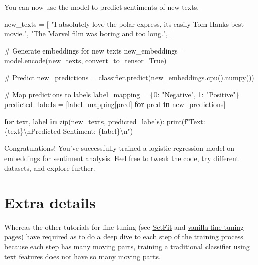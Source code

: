 \documentclass[
  letterpaper,
  DIV=11,
  numbers=noendperiod]{scrreprt}
\newenvironment{Shaded}{\begin{snugshade}}{\end{snugshade}}
\newcommand{\BuiltInTok}[1]{\textcolor[rgb]{0.00,0.23,0.31}{#1}}
\newcommand{\CharTok}[1]{\textcolor[rgb]{0.13,0.47,0.30}{#1}}
\newcommand{\CommentTok}[1]{\textcolor[rgb]{0.37,0.37,0.37}{#1}}
\newcommand{\ControlFlowTok}[1]{\textcolor[rgb]{0.00,0.23,0.31}{\textbf{#1}}}
\newcommand{\DecValTok}[1]{\textcolor[rgb]{0.68,0.00,0.00}{#1}}
\newcommand{\KeywordTok}[1]{\textcolor[rgb]{0.00,0.23,0.31}{\textbf{#1}}}
\newcommand{\NormalTok}[1]{\textcolor[rgb]{0.00,0.23,0.31}{#1}}
\newcommand{\OperatorTok}[1]{\textcolor[rgb]{0.37,0.37,0.37}{#1}}
\newcommand{\SpecialCharTok}[1]{\textcolor[rgb]{0.37,0.37,0.37}{#1}}
\newcommand{\SpecialStringTok}[1]{\textcolor[rgb]{0.13,0.47,0.30}{#1}}
\newcommand{\StringTok}[1]{\textcolor[rgb]{0.13,0.47,0.30}{#1}}
\newcommand{\VariableTok}[1]{\textcolor[rgb]{0.07,0.07,0.07}{#1}}
\begin{document}
You can now use the model to predict sentiments of new texts.

\begin{Shaded}
\begin{Highlighting}[]
\NormalTok{new\_texts }\OperatorTok{=}\NormalTok{ [}
    \StringTok{"I absolutely love the polar express, it\textquotesingle{}s easily Tom Hanks\textquotesingle{} best movie."}\NormalTok{,}
    \StringTok{"The Marvel film was boring and too long."}\NormalTok{,}
\NormalTok{]}

\CommentTok{\# Generate embeddings for new texts}
\NormalTok{new\_embeddings }\OperatorTok{=}\NormalTok{ model.encode(new\_texts, convert\_to\_tensor}\OperatorTok{=}\VariableTok{True}\NormalTok{)}

\CommentTok{\# Predict}
\NormalTok{new\_predictions }\OperatorTok{=}\NormalTok{ classifier.predict(new\_embeddings.cpu().numpy())}

\CommentTok{\# Map predictions to labels}
\NormalTok{label\_mapping }\OperatorTok{=}\NormalTok{ \{}\DecValTok{0}\NormalTok{: }\StringTok{"Negative"}\NormalTok{, }\DecValTok{1}\NormalTok{: }\StringTok{"Positive"}\NormalTok{\}}
\NormalTok{predicted\_labels }\OperatorTok{=}\NormalTok{ [label\_mapping[pred] }\ControlFlowTok{for}\NormalTok{ pred }\KeywordTok{in}\NormalTok{ new\_predictions]}

\ControlFlowTok{for}\NormalTok{ text, label }\KeywordTok{in} \BuiltInTok{zip}\NormalTok{(new\_texts, predicted\_labels):}
    \BuiltInTok{print}\NormalTok{(}\SpecialStringTok{f"Text: }\SpecialCharTok{\{}\NormalTok{text}\SpecialCharTok{\}}\CharTok{\textbackslash{}n}\SpecialStringTok{Predicted Sentiment: }\SpecialCharTok{\{}\NormalTok{label}\SpecialCharTok{\}}\CharTok{\textbackslash{}n}\SpecialStringTok{"}\NormalTok{)}
\end{Highlighting}
\end{Shaded}

Congratulations! You've successfully trained a logistic regression model
on embeddings for sentiment analysis. Feel free to tweak the code, try
different datasets, and explore further.

\section{Extra details}\label{extra-details}

Whereas the other tutorials for fine-tuning (see
\href{setfit.qmd}{SetFit} and \href{vanilla_finetuning.qmd}{vanilla
fine-tuning} pages) have required as to do a deep dive to each step of
the training process because each step has many moving parts, training a
traditional classifier using text features does not have so many moving
parts.
\end{document}
